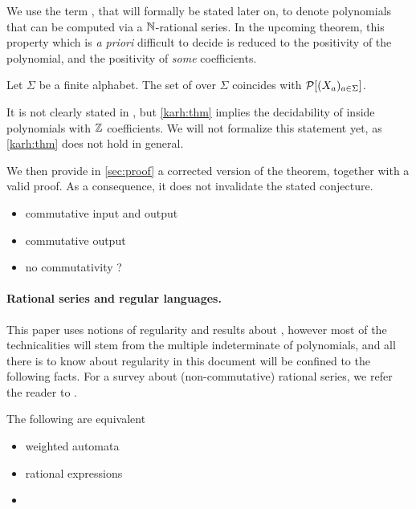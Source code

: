 \documentclass[a4paper,11pt]{article}
\begin{document}
We use the term , that will formally be
stated later on, to denote polynomials that can be computed via a
$\mathbb{N}$-rational series. In the upcoming theorem, this property
which is \emph{a priori} difficult to decide is reduced to 
the positivity of the polynomial, and the positivity of \emph{some}
coefficients. 


\begin{theorem} 
    \label{karh:thm}
    Let $\Sigma$ be a finite alphabet.
    The set of  over $\Sigma$
    coincides with $\mathcal{P}[(X_a)_{a \in \Sigma}]$.
\end{theorem}

It is not clearly stated in \cite{KARH77}, but \cref{karh:thm} implies the
decidability of  inside polynomials with $\mathbb{Z}$
coefficients. We will not formalize this statement yet, as \cref{karh:thm}
does not hold in general.


We then provide in \cref{sec:proof} a
corrected version of the theorem, together with a valid proof. As a
consequence, it does not invalidate the stated conjecture.

\begin{itemize}
    \item commutative input and output
    \item commutative output
    \item no commutativity ?
\end{itemize}

\AP \paragraph*{Rational series and regular languages.} This paper uses notions
of regularity and results about , however most of
the technicalities will stem from the multiple indeterminate of polynomials,
and all there is to know about regularity in this document will be confined to
the following facts. For a survey about (non-commutative) rational series, we
refer the reader to \cite{berstel2011noncommutative}. 

\begin{definition}
    The following are equivalent
    \begin{itemize}
        \item weighted automata
        \item rational expressions
        \item 
    \end{itemize}
\end{definition}
\end{document}
